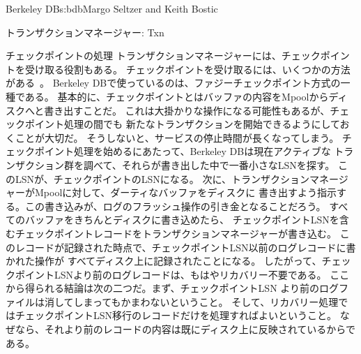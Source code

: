 \begin{aosachapter}{Berkeley DB}{s:bdb}{Margo Seltzer and Keith Bostic}
\begin{aosasect1}{トランザクションマネージャー: Txn}
\begin{aosasect2}{チェックポイントの処理}
トランザクションマネージャーには、チェックポイントを受け取る役割もある。
チェックポイントを受け取るには、いくつかの方法がある~\cite{bib:haerder:recovery}。
Berkeley DBで使っているのは、ファジーチェックポイント方式の一種である。
基本的に、チェックポイントとはバッファの内容をMpoolからディスクへと書き出すことだ。
これは大掛かりな操作になる可能性もあるが、チェックポイント処理の間でも
新たなトランザクションを開始できるようにしておくことが大切だ。
そうしないと、サービスの停止時間が長くなってしまう。
チェックポイント処理を始めるにあたって、Berkeley DBは現在アクティブな
トランザクション群を調べて、それらが書き出した中で一番小さなLSNを探す。
このLSNが、チェックポイントのLSNになる。
次に、トランザクションマネージャーがMpoolに対して、ダーティなバッファをディスクに
書き出すよう指示する。この書き込みが、ログのフラッシュ操作の引き金となることだろう。
すべてのバッファをきちんとディスクに書き込めたら、
チェックポイントLSNを含むチェックポイントレコードをトランザクションマネージャーが書き込む。
このレコードが記録された時点で、チェックポイントLSN以前のログレコードに書かれた操作が
すべてディスク上に記録されたことになる。
したがって、チェックポイントLSNより前のログレコードは、もはやリカバリー不要である。
ここから得られる結論は次の二つだ。まず、チェックポイントLSN
より前のログファイルは消してしまってもかまわないということ。
そして、リカバリー処理ではチェックポイントLSN移行のレコードだけを処理すればよいということ。
なぜなら、それより前のレコードの内容は既にディスク上に反映されているからである。


\end{aosasect2}
\end{aosasect1}
\end{aosachapter}
